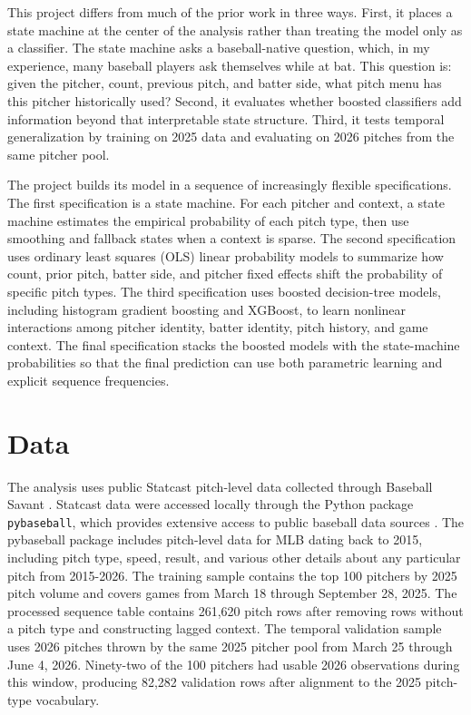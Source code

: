 \documentclass[9pt,twoside]{pnas-new}
\begin{document}
This project differs from much of the prior work in three ways. First, it places a  state machine at the center of the analysis rather than treating the model only as a classifier. The state machine asks a baseball-native question, which, in my experience, many baseball players ask themselves while at bat. This question is: given the pitcher, count, previous pitch, and batter side, what pitch menu has this pitcher historically used? Second, it evaluates whether boosted classifiers add information beyond that interpretable state structure. Third, it tests temporal generalization by training on 2025 data and evaluating on 2026 pitches from the same pitcher pool.

The project builds its model in a sequence of increasingly flexible specifications. The first specification is a state machine. For each pitcher and context, a state machine estimates the empirical probability of each pitch type, then use smoothing and fallback states when a context is sparse. The second specification uses ordinary least squares (OLS) linear probability models to summarize how count, prior pitch, batter side, and pitcher fixed effects shift the probability of specific pitch types. The third specification uses boosted decision-tree models, including histogram gradient boosting and XGBoost, to learn nonlinear interactions among pitcher identity, batter identity, pitch history, and game context. The final specification stacks the boosted models with the state-machine probabilities so that the final prediction can use both parametric learning and explicit sequence frequencies.

\section*{Data}

The analysis uses public Statcast pitch-level data collected through Baseball Savant \cite{baseballsavant}. Statcast data were accessed locally through the Python package \texttt{pybaseball}, which provides extensive access to public baseball data sources \cite{pybaseball}. The pybaseball package includes pitch-level data for MLB dating back to 2015, including pitch type, speed, result, and various other details about any particular pitch from 2015-2026. The training sample contains the top 100 pitchers by 2025 pitch volume and covers games from March 18 through September 28, 2025. The processed sequence table contains 261,620 pitch rows after removing rows without a pitch type and constructing lagged context. The temporal validation sample uses 2026 pitches thrown by the same 2025 pitcher pool from March 25 through June 4, 2026. Ninety-two of the 100 pitchers had usable 2026 observations during this window, producing 82,282 validation rows after alignment to the 2025 pitch-type vocabulary.
\end{document}
